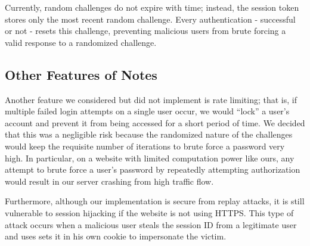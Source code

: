 \documentclass[11pt]{article}
\begin{document}
Currently, random challenges do not expire with time; instead, the session token stores only the most recent random challenge. Every authentication - successful or not - resets this challenge, preventing malicious users from brute forcing a valid response to a randomized challenge.

\subsection{Other Features of Notes}

Another feature we considered but did not implement is rate limiting; that is, if multiple failed login attempts on a single user occur, we would “lock” a user’s account and prevent it from being accessed for a short period of time. We decided that this was a negligible risk because the randomized nature of the challenges would keep the requisite number of iterations to brute force a password very high. In particular, on a website with limited computation power like ours, any attempt to brute force a user’s password by repeatedly attempting authorization would result in our server crashing from high traffic flow.

Furthermore, although our implementation is secure from replay attacks, it is still vulnerable to session hijacking if the website is not using HTTPS. This type of attack occurs when a malicious user steals the session ID from a legitimate user and uses sets it in his own cookie to impersonate the victim.
\end{document}
